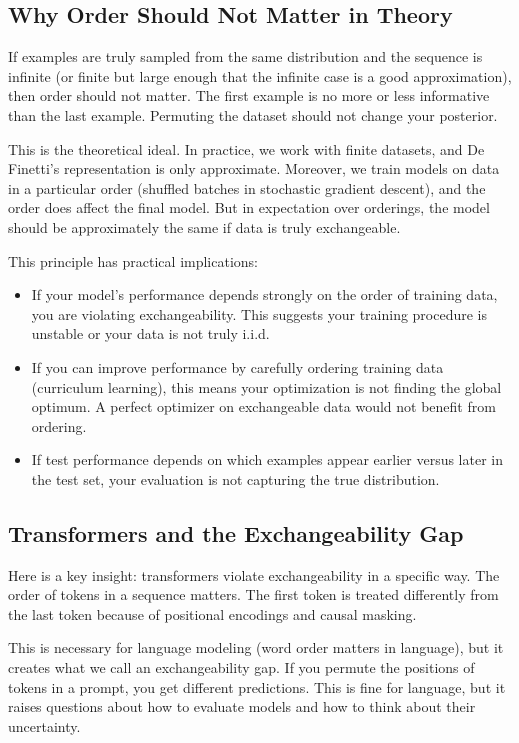 \subsection{Why Order Should Not Matter in Theory}

If examples are truly sampled from the same distribution and the sequence is infinite (or finite but large enough that the infinite case is a good approximation), then order should not matter. The first example is no more or less informative than the last example. Permuting the dataset should not change your posterior.

This is the theoretical ideal. In practice, we work with finite datasets, and De Finetti's representation is only approximate. Moreover, we train models on data in a particular order (shuffled batches in stochastic gradient descent), and the order does affect the final model. But in expectation over orderings, the model should be approximately the same if data is truly exchangeable.

This principle has practical implications:

\begin{itemize}
\item If your model's performance depends strongly on the order of training data, you are violating exchangeability. This suggests your training procedure is unstable or your data is not truly i.i.d.

\item If you can improve performance by carefully ordering training data (curriculum learning), this means your optimization is not finding the global optimum. A perfect optimizer on exchangeable data would not benefit from ordering.

\item If test performance depends on which examples appear earlier versus later in the test set, your evaluation is not capturing the true distribution.
\end{itemize}

\subsection{Transformers and the Exchangeability Gap}

Here is a key insight: transformers violate exchangeability in a specific way. The order of tokens in a sequence matters. The first token is treated differently from the last token because of positional encodings and causal masking.

This is necessary for language modeling (word order matters in language), but it creates what we call an exchangeability gap. If you permute the positions of tokens in a prompt, you get different predictions. This is fine for language, but it raises questions about how to evaluate models and how to think about their uncertainty.

